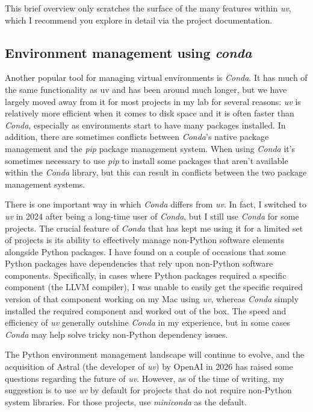 This brief overview only scratches the surface of the many features within \textit{uv}, which I recommend you explore in detail via the project documentation.

\subsection{Environment management using \textit{conda}}

Another popular tool for managing virtual environments is \textit{Conda}.
It has much of the same functionality as uv and has been around much longer, but we have largely moved away from it for most projects in my lab for several reasons: \textit{uv} is relatively more efficient when it comes to disk space and it is often faster than \textit{Conda}, especially as environments start to have many packages installed.
In addition, there are sometimes conflicts between \textit{Conda}'s native package management and the \textit{pip} package management system.
When using \textit{Conda} it's sometimes necessary to use \textit{pip} to install some packages that aren't available within the \textit{Conda} library, but this can result in conflicts between the two package management systems.

There is one important way in which \textit{Conda} differs from \textit{uv}.
In fact, I switched to \textit{uv} in 2024 after being a long-time user of \textit{Conda}, but I still use \textit{Conda} for some projects.
The crucial feature of \textit{Conda} that has kept me using it for a limited set of projects is its ability to effectively manage non-Python software elements alongside Python packages.
I have found on a couple of occasions that some Python packages have dependencies that rely upon non-Python software components.
Specifically, in cases where Python packages required a specific component (the LLVM compiler), I was unable to easily get the specific required version of that component working on my Mac using \textit{uv}, whereas \textit{Conda} simply installed the required component and worked out of the box.
The speed and efficiency of \textit{uv} generally outshine \textit{Conda} in my experience, but in some cases \textit{Conda} may help solve tricky non-Python dependency issues.

The Python environment management landscape will continue to evolve, and the acquisition of Astral (the developer of \textit{uv}) by OpenAI in 2026 has raised some questions regarding the future of \textit{uv}. However, as of the time of writing, my suggestion is to use \textit{uv} by default for projects that do not require non-Python system libraries. For those projects, use \textit{miniconda} as the default.

